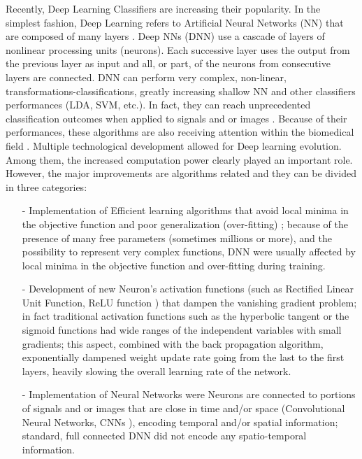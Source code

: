 \documentclass[12pt ]{iopart}
\begin{document}
Recently, Deep Learning Classifiers are increasing their popularity. In the simplest fashion, Deep Learning  refers to Artificial Neural Networks (NN) that are composed of many layers \parencite{lecun2015deep} . Deep NNs (DNN) use a cascade of  layers of nonlinear processing units (neurons). Each successive layer uses the output from the previous layer as input and all, or part, of the neurons from consecutive layers are connected. DNN can perform very complex, non-linear, transformations-classifications, greatly increasing shallow NN \parencite{cheng1994neural} and other classifiers performances (LDA, SVM, etc.). In fact, they can reach unprecedented classification outcomes when applied to signals and or images \parencite{lecun2015deep}. Because of their performances, these algorithms are also receiving  attention within the biomedical field \parencite{deng2014deep}. 
Multiple technological development allowed for Deep learning evolution. 
Among them, the increased computation power clearly played an important role.
However, the major improvements are algorithms related and they can be divided in three  categories:

\begin{itemize}
	\item[-] Implementation of Efficient learning algorithms that avoid local minima in the objective function and poor generalization (over-fitting) \parencite{srivastava2014dropout}; because of the presence of many free parameters (sometimes millions or more), and the possibility to represent very complex functions, DNN were usually affected by local minima in the objective function and over-fitting  during training. 
	\item[-] Development of new Neuron's activation functions (such as Rectified Linear Unit Function, ReLU function \parencite{krizhevsky2012imagenet}) that dampen  the vanishing gradient problem; in fact traditional activation functions such as the hyperbolic tangent or the sigmoid functions had wide ranges of the independent variables with small gradients;  this aspect, combined with the back propagation algorithm, exponentially dampened weight update rate going from the last to the first layers, heavily slowing the overall learning rate of the network.
	\item[-] Implementation of  Neural Networks were Neurons are connected to portions of signals and or images that are close in time and/or space (Convolutional Neural Networks, CNNs \parencite{lecun2015deep}), encoding temporal and/or spatial information; standard, full connected DNN  did not encode any spatio-temporal information.
\end{itemize}
\end{document}
